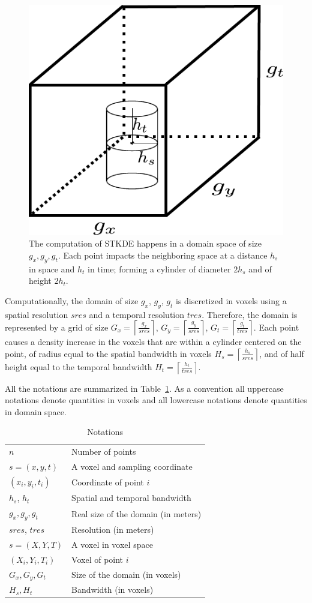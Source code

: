 \documentclass[10pt, conference, compsocconf]{IEEEtran}
\newcommand{\ceil}[1]{\left\lceil #1 \right\rceil}
\begin{document}
\begin{figure}
  \centering
  \includegraphics[width=.5\linewidth]{stkde.pdf}
  \caption{The computation of STKDE happens in a domain space of size
    $g_x,g_y,g_t$. Each point impacts the neighboring space at a
    distance $h_s$ in space and $h_t$ in time; forming a cylinder of
    diameter $2 h_s$ and of height $2 h_t$.}
  \label{fig:stkde}
\end{figure}

Computationally, the domain of size $g_x$, $g_y$, $g_t$ is discretized
in voxels using a spatial resolution $sres$ and a temporal resolution
$tres$. Therefore, the domain is represented by a grid of size
$G_x=\ceil{\frac{g_x}{sres}}$, $G_y=\ceil{\frac{g_y}{sres}}$,
$G_t=\ceil{\frac{g_t}{tres}}$. Each point causes a density increase in
the voxels that are within a cylinder centered on the point, of
radius equal to the spatial bandwidth in voxels
$H_s=\ceil{\frac{h_s}{sres}}$, and of half height equal to the
temporal bandwidth $H_t=\ceil{\frac{h_t}{tres}}$.

All the notations are summarized in Table~\ref{tab:notation}. As a
convention all uppercase notations denote quantities in voxels and all
lowercase notations denote quantities in domain space.

\begin{table}
  \centering
  \begin{tabular}{|l|l|}
    \hline 
    $n$ & Number of points\\
    $s = (x,y,t)$ & A voxel and sampling coordinate\\
    $(x_i, y_i, t_i)$ & Coordinate of point $i$\\
    $h_s$, $h_t$ & Spatial and temporal bandwidth \\ 
    $g_x, g_y, g_t$ & Real size of the domain (in meters) \\
    \hline
    $sres$, $tres$ & Resolution (in meters) \\
    $s = (X,Y,T)$ & A voxel in voxel space\\
    $(X_i, Y_i, T_i)$ & Voxel of point $i$\\
    $G_x, G_y, G_t$ & Size of the domain (in voxels)\\
    $H_s, H_t$ & Bandwidth (in voxels) \\
    \hline 
  \end{tabular}
  ~
  \caption{Notations}
  \label{tab:notation}
\end{table}
\end{document}
